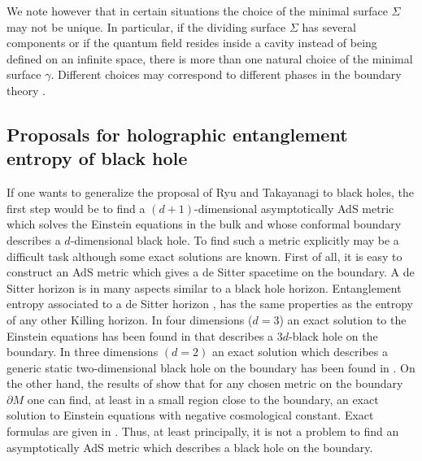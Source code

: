 \documentclass[12pt]{article}
\begin{document}
We note however that in certain situations the choice of the minimal surface $\Sigma$ may not be  unique. In particular, if the dividing surface $\Sigma$ has several components or 
if the quantum field resides inside a cavity instead of being defined on an infinite space,  there is more than one natural choice of the minimal surface 
$\gamma$. Different choices may correspond to  different phases in the boundary theory \cite{Klebanov:2007ws}.


\subsection{Proposals for holographic entanglement entropy of black hole}


If one wants to generalize the proposal of Ryu and Takayanagi to black holes, the first step would be to find a $(d+1)$-dimensional asymptotically AdS metric which solves the Einstein equations in the bulk and whose conformal boundary describes a $d$-dimensional black hole. To find such a metric explicitly may be a difficult task although some exact solutions are known. First of all, it is easy to construct an AdS metric which gives a de Sitter spacetime on the boundary. A de Sitter horizon is in many aspects similar to a black hole horizon.
Entanglement entropy associated to a de Sitter horizon \cite{Hawking:2000da}, \cite{Iwashita:2006zj} has the same properties as the entropy of any other Killing horizon. In four dimensions ($d=3$) an exact solution to the Einstein equations has been found in \cite{Emparan:1999wa}   that describes a $3d$-black hole on the boundary. In three dimensions $(d=2)$ an exact solution which describes a generic
static two-dimensional black hole on the boundary has been found in \cite{Skenderis:1999nb}. On the other hand, the results of \cite{deHaro:2000xn} show that for any chosen metric on the boundary $\partial M$ one can find, at least in a small region  close to the boundary, an exact solution to Einstein equations with negative cosmological constant. Exact formulas are given in
\cite{deHaro:2000xn}. Thus, at least principally, it is not a problem to find an asymptotically AdS metric which describes a black hole on the boundary.
\end{document}

